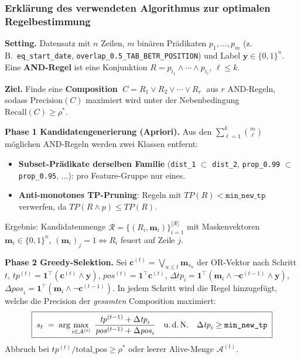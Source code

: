 \documentclass[aspectratio=169,10pt]{beamer}
\newcommand{\hl}[1]{\textbf{#1}}
\newcommand{\m}{\mathbf{m}}
\newcommand{\y}{\mathbf{y}}
\newcommand{\cv}{\mathbf{c}}
\begin{document}
{
\begin{frame}[t]
\frametitle{Erkl\"arung des verwendeten Algorithmus zur optimalen Regelbestimmung}

\scriptsize

\textbf{Setting.}\quad
Datensatz mit $n$ Zeilen, $m$ bin\"aren Pr\"adikaten $p_1,\dots,p_m$ (z.\,B.\ \texttt{eq\_start\_date}, \texttt{overlap\_0.5\_TAB\_BETR\_POSITION}) und Label
$\y \in \{0,1\}^n$. Eine \hl{AND-Regel} ist eine Konjunktion $R = p_{i_1} \land \cdots \land p_{i_\ell}$, $\ell \leq k$.

\smallskip

\textbf{Ziel.}\quad
Finde eine \hl{Composition} $\;C = R_1 \lor R_2 \lor \cdots \lor R_r\;$ aus $r$ AND-Regeln, sodass
$\mathrm{Precision}(C)$ maximiert wird unter der Nebenbedingung $\mathrm{Recall}(C) \geq \rho^*$.

\medskip

\textbf{Phase 1 \textemdash{} Kandidatengenerierung (Apriori).}\quad
Aus den $\sum_{\ell=1}^{k}\binom{m}{\ell}$ m\"oglichen AND-Regeln werden zwei Klassen entfernt:
\begin{itemize}\itemsep0pt
  \item \hl{Subset-Pr\"adikate derselben Familie} (\texttt{dist\_1} $\subset$ \texttt{dist\_2}, \texttt{prop\_0.99} $\subset$ \texttt{prop\_0.95}, $\dots$): pro Feature-Gruppe nur eines.
  \item \hl{Anti-monotones TP-Pruning}: Regeln mit $\mathit{TP}(R) < \texttt{min\_new\_tp}$ verwerfen, da $\mathit{TP}(R \land p) \leq \mathit{TP}(R)$.
\end{itemize}
Ergebnis: Kandidatenmenge $\mathcal{R} = \{(R_i, \m_i)\}_{i=1}^{|\mathcal{R}|}$ mit Maskenvektoren $\m_i \in \{0,1\}^n$, $(\m_i)_j = 1 \Leftrightarrow R_i$ feuert auf Zeile $j$.

\medskip

\textbf{Phase 2 \textemdash{} Greedy-Selektion.}\quad
Sei $\cv^{(t)} = \bigvee_{u\leq t}\m_{s_u}$ der OR-Vektor nach Schritt $t$,
$\mathit{tp}^{(t)} = \mathbf{1}^\top(\cv^{(t)} \!\wedge\! \y)$,
$\mathit{pos}^{(t)} = \mathbf{1}^\top \cv^{(t)}$,
$\Delta\mathit{tp}_i = \mathbf{1}^\top(\m_i \!\wedge\! \neg\cv^{(t-1)} \!\wedge\! \y)$,
$\Delta\mathit{pos}_i = \mathbf{1}^\top(\m_i \!\wedge\! \neg\cv^{(t-1)})$.
In jedem Schritt wird die Regel hinzugef\"ugt, welche die Precision der \emph{gesamten} Composition maximiert:
\[
\boxed{\;
s_t \;=\; \arg\max_{i \in \mathcal{A}^{(t)}}\;
\frac{\mathit{tp}^{(t-1)} + \Delta\mathit{tp}_i}{\mathit{pos}^{(t-1)} + \Delta\mathit{pos}_i}
\quad\text{u.\,d.\,N.}\quad \Delta\mathit{tp}_i \geq \texttt{min\_new\_tp}\;}
\]
Abbruch bei $\mathit{tp}^{(t)}/\text{total\_pos} \geq \rho^*$ oder leerer Alive-Menge $\mathcal{A}^{(t)}$.


\end{frame}}
\end{document}
